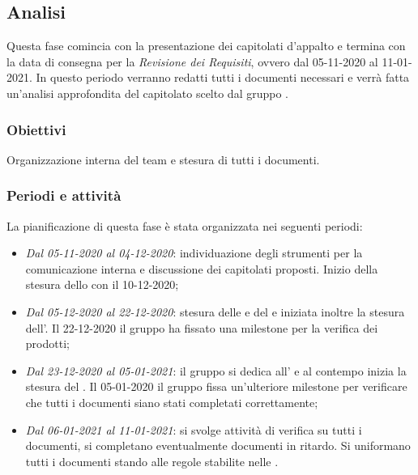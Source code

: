 \subsection{Analisi}
Questa fase comincia con la presentazione dei capitolati d'appalto e termina con la data di consegna per la \textit{Revisione dei Requisiti}, ovvero dal 05-11-2020 al 11-01-2021.
In questo periodo verranno redatti tutti i documenti necessari e verrà fatta un'analisi approfondita del capitolato scelto dal gruppo \Gruppo{}.

\subsubsection{Obiettivi}
Organizzazione interna del team e stesura di tutti i documenti.

\subsubsection{Periodi e attività}
La pianificazione di questa fase è stata organizzata nei seguenti periodi:
\begin{itemize}
\item \textit{Dal 05-11-2020 al 04-12-2020}: individuazione degli strumenti per la comunicazione interna e discussione dei capitolati proposti. Inizio della stesura dello \SdF{} con  il 10-12-2020;

\item \textit{Dal 05-12-2020 al 22-12-2020}: stesura delle \NdP{} e del \PdP{} e iniziata inoltre la stesura dell'\AdR{}. Il 22-12-2020 il gruppo ha fissato una milestone\glo{} per la verifica dei prodotti;

\item \textit{Dal 23-12-2020 al 05-01-2021}: il gruppo si dedica all'\AdR{} e al contempo inizia la stesura del \PdQ{}. Il 05-01-2020 il gruppo fissa un'ulteriore milestone\glo{} per verificare che tutti i documenti siano stati completati correttamente;

\item \textit{Dal 06-01-2021 al 11-01-2021}: si svolge attività di verifica su tutti i documenti, si completano eventualmente documenti in ritardo. Si uniformano tutti i documenti stando alle regole stabilite nelle \NdP{}.
\end{itemize}

